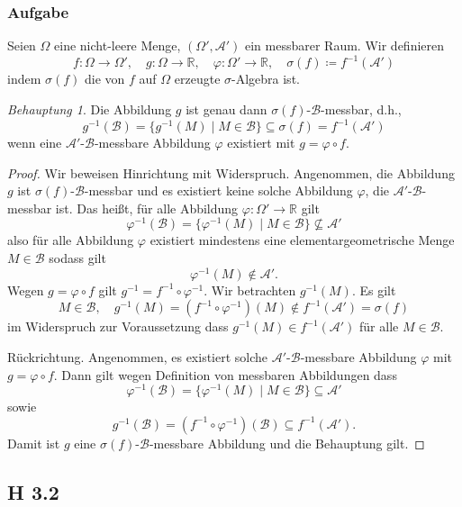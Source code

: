 \documentclass[draft,a5paper]{article}
\theoremstyle{remark}
\newtheorem*{Behauptung}{Behauptung}
\begin{document}
\subsubsection{Aufgabe}
  Seien \(\Omega\) eine nicht-leere Menge, \((\Omega', \mathcal{A}')\) ein messbarer Raum.
  Wir definieren
  \[f\colon \Omega \to \Omega', \quad g\colon \Omega \to \mathbb{R}, \quad \varphi\colon \Omega' \to \mathbb{R}, \quad \sigma(f) \coloneq f^{-1}(\mathcal{A}')\] indem
  \(\sigma(f)\) die von \(f\) auf \(\Omega\) erzeugte \(\sigma\)-Algebra ist.
\begin{Behauptung}
  Die Abbildung \(g\) ist genau dann \(\sigma(f)\)-\(\mathcal{B}\)-messbar, d.h.,
  \[g^{-1}(\mathcal{B}) = \{g^{-1}(M) \mid M \in \mathcal{B}\} \subseteq \sigma(f) = f^{-1}(\mathcal{A}')\] wenn eine
  \(\mathcal{A}'\)-\(\mathcal{B}\)-messbare Abbildung \(\varphi\) existiert mit \(g = \varphi \circ f\).
\end{Behauptung}
\begin{proof}
  Wir beweisen Hinrichtung mit Widerspruch.  Angenommen, die Abbildung
  \(g\) ist \(\sigma(f)\)-\(\mathcal{B}\)-messbar und es existiert keine solche Abbildung
  \(\varphi\), die \(\mathcal{A}'\)-\(\mathcal{B}\)-messbar ist.  Das heißt, für alle Abbildung
  \(\varphi\colon \Omega' \to \mathbb{R}\) gilt
  \[\varphi^{-1}(\mathcal{B}) = \{\varphi^{-1}(M) \mid M \in \mathcal{B}\} \nsubseteq \mathcal{A}'\]
  also für alle Abbildung \(\varphi\) existiert mindestens eine
  elementargeometrische Menge \(M \in \mathcal{B}\) sodass gilt
  \[\varphi^{-1}(M) \notin \mathcal{A}'.\]
  Wegen \(g = \varphi \circ f\) gilt \(g^{-1} = f^{-1} \circ \varphi^{-1}\).  Wir betrachten
  \(g^{-1}(M)\).  Es gilt
  \[M \in \mathcal{B}, \quad g^{-1}(M) = (f^{-1} \circ \varphi^{-1})(M) \notin f^{-1}(\mathcal{A}') = \sigma(f)\]
  im Widerspruch zur Voraussetzung dass \(g^{-1}(M) \in f^{-1}(\mathcal{A}')\) für alle \(M \in
  \mathcal{B}\).

  Rückrichtung.  Angenommen, es existiert solche \(\mathcal{A}'\)-\(\mathcal{B}\)-messbare
  Abbildung \(\varphi\) mit \(g = \varphi \circ f\).  Dann gilt wegen Definition von
  messbaren Abbildungen dass
  \[\varphi^{-1}(\mathcal{B}) = \{\varphi^{-1}(M) \mid M \in \mathcal{B}\} \subseteq \mathcal{A}'\]
  sowie
  \[g^{-1}(\mathcal{B}) = (f^{-1} \circ \varphi^{-1})(\mathcal{B}) \subseteq f^{-1}(\mathcal{A}').\]
  Damit ist \(g\)  eine \(\sigma(f)\)-\(\mathcal{B}\)-messbare Abbildung und die Behauptung
  gilt.
\end{proof}
\subsection{H 3.2}
\end{document}

